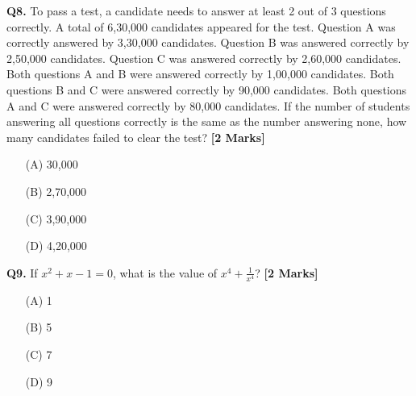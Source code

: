 \documentclass[11pt]{article}
\newcommand{\questionb}[2]{
    \noindent\textbf{Q#2.} #1 \hfill \textbf{[2 Marks]}
}
\begin{document}
\questionb{To pass a test, a candidate needs to answer at least 2 out of 3 questions correctly. A total of 6,30,000 candidates appeared for the test. Question A was correctly answered by 3,30,000 candidates. Question B was answered correctly by 2,50,000 candidates. Question C was answered correctly by 2,60,000 candidates. Both questions A and B were answered correctly by 1,00,000 candidates. Both questions B and C were answered correctly by 90,000 candidates. Both questions A and C were answered correctly by 80,000 candidates. If the number of students answering all questions correctly is the same as the number answering none, how many candidates failed to clear the test?}{8}
\begin{enumerate}
    \item[(A)] 30,000
    \item[(B)] 2,70,000
    \item[(C)] 3,90,000
    \item[(D)] 4,20,000
\end{enumerate}
\vspace{0.5cm}

\questionb{If \(x^2 + x - 1 = 0\), what is the value of \(x^4 + \frac{1}{x^4}\)?}{9}
\begin{enumerate}
    \item[(A)] 1
    \item[(B)] 5
    \item[(C)] 7
    \item[(D)] 9
\end{enumerate}
\vspace{0.5cm}
\end{document}
